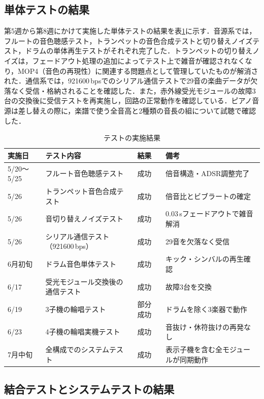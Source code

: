\documentclass[uplatex,dvipdfmx]{jlreq}
\begin{document}
\subsection{単体テストの結果}

第5週から第8週にかけて実施した単体テストの結果を表\ref{tab:tests}に示す．音源系では，フルートの音色聴感テスト，トランペットの音色合成テストと切り替えノイズテスト，ドラムの単体再生テストがそれぞれ完了した．トランペットの切り替えノイズは，フェードアウト処理の追加によってテスト上で雑音が確認されなくなり，MOP4（音色の再現性）に関連する問題点として管理していたものが解消された．通信系では，921600\,bpsでのシリアル通信テストで29音の楽曲データが欠落なく受信・格納されることを確認した．また，赤外線受光モジュールの故障3台の交換後に受信テストを再実施し，回路の正常動作を確認している．ピアノ音源は差し替えの際に，楽譜で使う全音高と2種類の音長の組について試聴で確認した．

\begin{table}[tb]
\caption{テストの実施結果}
\label{tab:tests}
\begin{center}
\small
\begin{tabular}{llll}
\hline
実施日 & テスト内容 & 結果 & 備考 \\
\hline
5/20〜5/25 & フルート音色聴感テスト & 成功 & 倍音構造・ADSR調整完了 \\
5/26 & トランペット音色合成テスト & 成功 & 倍音比とビブラートの確定 \\
5/26 & 音切り替えノイズテスト & 成功 & 0.03\,sフェードアウトで雑音解消 \\
5/26 & シリアル通信テスト（921600\,bps） & 成功 & 29音を欠落なく受信 \\
6月初旬 & ドラム音色単体テスト & 成功 & キック・シンバルの再生確認 \\
6/17 & 受光モジュール交換後の通信テスト & 成功 & 故障3台を交換 \\
6/19 & 3子機の輪唱テスト & 部分成功 & ドラムを除く3楽器で動作 \\
6/23 & 4子機の輪唱実機テスト & 成功 & 音抜け・休符抜けの再発なし \\
7月中旬 & 全構成でのシステムテスト & 成功 & 表示子機を含む全モジュールが同期動作 \\
\hline
\end{tabular}
\end{center}
\end{table}

\subsection{結合テストとシステムテストの結果}
\end{document}
